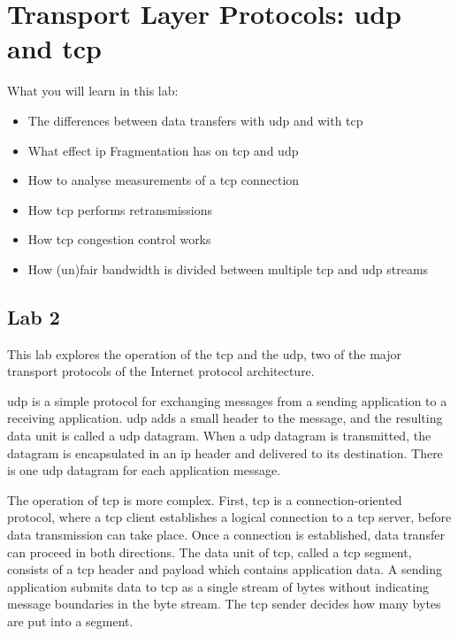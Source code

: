 
\setcounter{chapter}{1}
\chapter{Transport Layer Protocols: \ac{udp} and \ac{tcp}}

What you will learn in this lab:
\begin{itemize}
	\item The differences between data transfers with \ac{udp} and with \ac{tcp}
	\item What effect \acs{ip} Fragmentation has on \ac{tcp} and \ac{udp}
	\item How to analyse measurements of a \ac{tcp} connection
	\item How \ac{tcp} performs retransmissions
	\item How \ac{tcp} congestion control works
	\item How (un)fair bandwidth is divided between multiple \ac{tcp} and \ac{udp} streams
\end{itemize}

\newpage
\section{Lab 2}\label{sec:lab2}

This lab explores the operation of the \acf{tcp} and the \acf{udp}, two of the major transport protocols of the Internet protocol architecture.

\ac{udp} is a simple protocol for exchanging messages from a sending application to a receiving application. \ac{udp} adds a small header to the message, and the resulting data unit is called a \ac{udp} datagram. When a \ac{udp} datagram is transmitted, the datagram is encapsulated in an \acs{ip} header and delivered to its destination. There is one \ac{udp} datagram for each application message.

The operation of \ac{tcp} is more complex. First, \ac{tcp} is a connection-oriented protocol, where a \ac{tcp} client establishes a logical connection to a \ac{tcp} server, before data transmission can take place. Once a connection is established, data transfer can proceed in both directions. The data unit of \ac{tcp}, called a \ac{tcp} segment, consists of a \ac{tcp} header and payload which contains application data. A sending application submits data to \ac{tcp} as a single stream of bytes without indicating message boundaries in the byte stream. The \ac{tcp} sender decides how many bytes are put into a segment.

